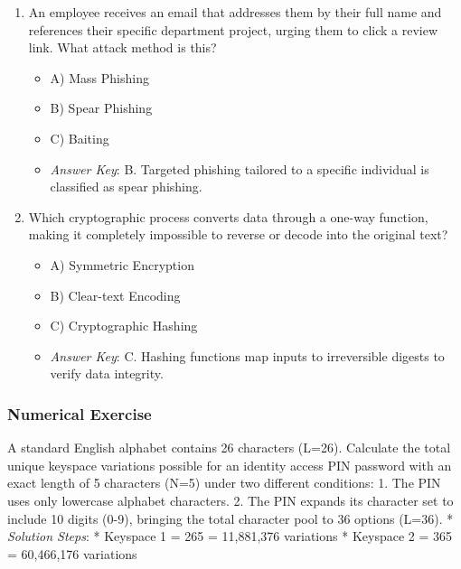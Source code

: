 \documentclass[12pt,openany]{book}
\begin{document}
\begin{enumerate}

  \item An employee receives an email that addresses them by their full name and references their specific department project, urging them to click a review link. What attack method is this?

\begin{itemize}

  \item A) Mass Phishing

  \item B) Spear Phishing

  \item C) Baiting

  \item \textit{Answer Key}: B. Targeted phishing tailored to a specific individual is classified as spear phishing.

\end{itemize}

  \item Which cryptographic process converts data through a one-way function, making it completely impossible to reverse or decode into the original text?

\begin{itemize}

  \item A) Symmetric Encryption

  \item B) Clear-text Encoding

  \item C) Cryptographic Hashing

  \item \textit{Answer Key}: C. Hashing functions map inputs to irreversible digests to verify data integrity.

\end{itemize}

\end{enumerate}


\subsubsection*{Numerical Exercise}


A standard English alphabet contains 26 characters (L=26). Calculate the total unique keyspace variations possible for an identity access PIN password with an exact length of 5 characters (N=5) under two different conditions:
1.  The PIN uses only lowercase alphabet characters.
2.  The PIN expands its character set to include 10 digits (0-9), bringing the total character pool to 36 options (L=36).
* \textit{Solution Steps}:
    * Keyspace 1 = 265 = 11,881,376 variations
    * Keyspace 2 = 365 = 60,466,176 variations
\end{document}
